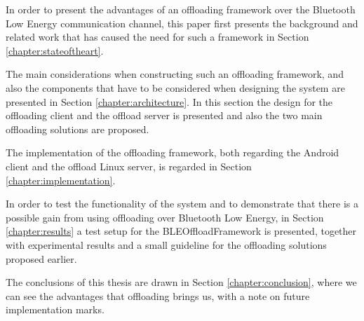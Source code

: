 In order to present the advantages of an offloading framework over the Bluetooth Low Energy communication channel, this paper first presents the background and related work that has caused the need for such a framework in Section \ref{chapter:stateoftheart}.

The main considerations when constructing such an offloading framework, and also the components that have to be considered when designing the system are presented in Section \ref{chapter:architecture}. In this section the design for the offloading client and the offload server is presented and also the two main offloading solutions are proposed.

The implementation of the offloading framework, both regarding the Android client and the offload Linux server, is regarded in Section \ref{chapter:implementation}.

In order to test the functionality of the system and to demonstrate that there is a possible gain from using offloading over Bluetooth Low Energy, in Section \ref{chapter:results} a test setup for the BLEOffloadFramework is presented, together with experimental results and a small guideline for the offloading solutions proposed earlier.

The conclusions of this thesis are drawn in Section \ref{chapter:conclusion}, where we can see the advantages that offloading brings us, with a note on future implementation marks.

